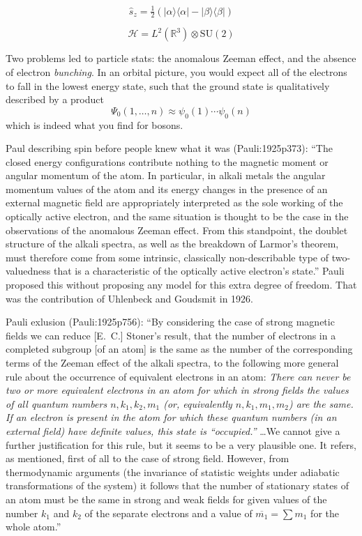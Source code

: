 \begin{equation}
    \hat{s}_z
    =
    \tfrac{1}{2}
    (
        |\alpha\rangle\langle\alpha|
        -
        |\beta\rangle\langle\beta|
    )
\end{equation}

\begin{equation}
    \mathcal{H}
    =
    L^2(\mathbb{R}^3)
    \otimes
    \mathrm{SU}(2)
\end{equation}


Two problems led to particle stats: the anomalous Zeeman effect, and the absence
of electron {\itshape bunching}.
In an orbital picture, you would expect all of the electrons to fall in the
lowest energy state, such that the ground state is qualitatively described by a
product
\begin{equation}
    \Psi_0(1,\ldots,n)
    \approx
    \psi_0(1)
    \cdots
    \psi_0(n)
\end{equation}
which is indeed what you find for bosons.

Paul describing spin before people knew what it was (Pauli:1925p373):
``The closed energy configurations contribute nothing to the magnetic moment or
angular momentum of the atom.
In particular, in alkali metals the angular momentum values of the atom and its
energy changes in the presence of an external magnetic field are appropriately
interpreted as the sole working of the optically active electron, and the same
situation is thought to be the case in the observations of the anomalous Zeeman
effect.
From this standpoint, the doublet structure of the alkali spectra, as well as
the breakdown of Larmor's theorem, must therefore come from some intrinsic,
classically non-describable type of two-valuedness that is a characteristic of
the optically active electron's state.''
Pauli proposed this without proposing any model for this extra degree of
freedom.
That was the contribution of Uhlenbeck and Goudsmit in 1926.


Pauli exlusion (Pauli:1925p756):
``By considering the case of strong magnetic fields we can reduce [E.~C.]
Stoner's result, that the number of electrons in a completed subgroup [of an
atom] is the same as the number of the corresponding terms of the Zeeman effect
of the alkali spectra, to the following more general rule about the occurrence
of equivalent electrons in an atom:
{\itshape
    There can never be two or more equivalent electrons in an atom for which in
    strong fields the values of all quantum numbers \(n, k_1, k_2, m_1\) (or,
    equivalently \(n, k_1, m_1, m_2\)) are  the same.
    If an electron is present in the atom for which these quantum numbers (in an
    external field) have definite values, this state is ``occupied.''%
}
\dots We cannot give a further justification for this rule, but it seems to be a
very plausible one.
It refers, as mentioned, first of all to the case of strong field.
However, from thermodynamic arguments (the invariance of statistic weights under
adiabatic transformations of the system) it follows that the number of
stationary states of an atom must be the same in strong and weak fields for
given values of the number \(k_1\) and \(k_2\) of the separate electrons and a
value of \(\overline{m_1}=\sum m_1\) for the whole atom.''

